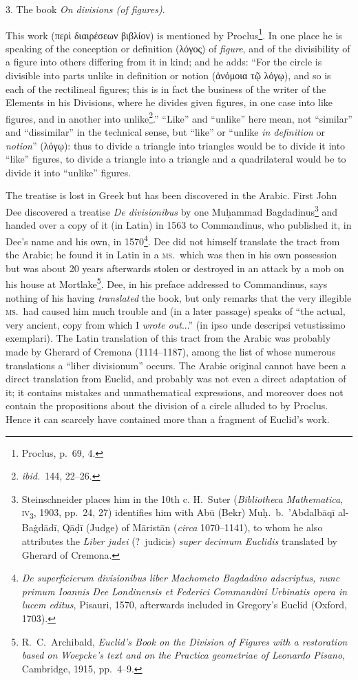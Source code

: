 3. The book \emph{On divisions (of figures)}.

This work (περὶ διαιρέσεων βιβλίον) is mentioned by Proclus\footnote{Proclus, p.~69, 4.}. In one place he is speaking of the conception or definition (λόγος) of \emph{figure}, and of the divisibility of a figure into others differing from it in kind; and he adds: ``For the circle is divisible into parts unlike in definition or notion (ἀνόμοια τῷ λόγῳ), and so is each of the rectilineal figures; this is in fact the business of the writer of the Elements in his Divisions, where he divides given figures, in one case into like figures, and in another into unlike\footnote{\emph{ibid.}\ 144, 22--26.}.'' ``Like'' and ``unlike'' here mean, not ``similar'' and ``dissimilar'' in the technical sense, but ``like'' or ``unlike \emph{in definition} or \emph{notion}'' (λόγῳ): thus to divide a triangle into triangles would be to divide it into ``like'' figures, to divide a triangle into a triangle and a quadrilateral would be to divide it into ``unlike'' figures.

The treatise is lost in Greek but has been discovered in the Arabic. First John Dee discovered a treatise \emph{De divisionibus} by one Muḥammad Bagdadinus\footnote{Steinschneider places him in the 10th c. H.~Suter (\emph{Bibliotheca Mathematica}, \textsc{iv}\textsubscript{3}, 1903, pp.~24, 27) identifies him with Abū (Bekr) Muḥ.\ b.~'Abdalbāqī al-Baġdādī, Qāḍī (Judge) of Māristān (\emph{circa} 1070--1141), to whom he also attributes the \emph{Liber judei} (?\ judicis) \emph{super decimum Euclidis} translated by Gherard of Cremona.} and handed over a copy of it (in Latin) in 1563 to Commandinus, who published it, in Dee's name and his own, in 1570\footnote{\emph{De superficierum divisionibus liber Machometo Bagdadino adscriptus, nunc primum Ioannis Dee Londinensis et Federici Commandini Urbinatis opera in lucem editus}, Pisauri, 1570, afterwards included in Gregory's Euclid (Oxford, 1703).}. Dee did not himself translate the tract from the Arabic; he found it in Latin in a \textsc{ms.}\ which was then in his own possession but was about 20 years afterwards stolen or destroyed in an attack by a mob on his house at Mortlake\footnote{R.~C.~Archibald, \emph{Euclid's Book on the Division of Figures with a restoration based on Woepcke's text and on the Practica geometriae of Leonardo Pisano}, Cambridge, 1915, pp.~4--9.}. Dee, in his preface addressed to Commandinus, says nothing of his having \emph{translated} the book, but only remarks that the very illegible \textsc{ms.}\ had caused him much trouble and (in a later passage) speaks of ``the actual, very ancient, copy from which I \emph{wrote out}...'' (in ipso unde descripsi vetustissimo exemplari). The Latin translation of this tract from the Arabic was probably made by Gherard of Cremona (1114--1187), among the list of whose numerous translations a ``liber divisionum'' occurs. The Arabic original cannot have been a direct translation from Euclid, and probably was not even a direct adaptation of it; it contains mistakes and unmathematical expressions, and moreover does not contain the propositions about the division of a circle alluded to by Proclus. Hence it can scarcely have contained more than a fragment of Euclid's work.

